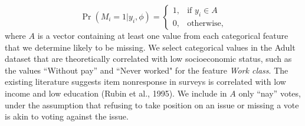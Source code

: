 \documentclass[10pt]{book}
\theoremstyle{definition}
\begin{document}
 \begin{equation}\label{3.1}
\Pr (M_i = 1 | y_i, \phi) = \begin{cases}
1, &\text{if $y_i \in A$}  \\
0, &\text{otherwise},
\end{cases}
\end{equation} where $A$ is a vector containing at least one value from each categorical feature that we determine likely to be missing. We select categorical values in the Adult dataset that are theoretically correlated with low socioeconomic status, such as the values ``Without pay'' and ``Never worked" for the feature \emph{Work class}. The existing literature suggests item nonresponse in surveys is correlated with low income and low education (Rubin et al., 1995). We include in $A$ only ``nay'' votes, under the assumption that refusing to take position on an issue or missing a vote is akin to voting against the issue. 
\end{document}
